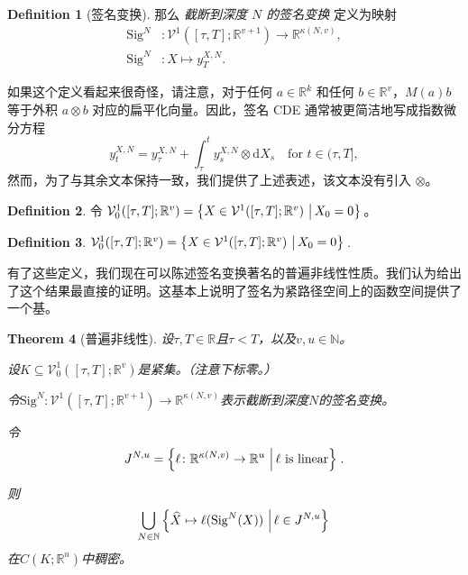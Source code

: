 \documentclass{ctexart}
\theoremstyle{plain}
\newtheorem{thm}{Theorem}[section]
\theoremstyle{definition}
\newtheorem{definition}[thm]{Definition}
\newcommand{\reals}{\mathbb{R}}
\newcommand{\naturals}{\mathbb{N}}
\newcommand{\set}[2]{\left\{{#1}\,\left\vert\,{#2}\vphantom{{#1}}\right\}\right.}
\begin{document}
\begin{definition}[签名变换]
那么 \emph{截断到深度 $N$ 的签名变换} 定义为映射
\begin{align*}
	\mathrm{Sig}^N &\colon \mathcal{V}^1([\tau, T]; \reals^{v + 1}) \to \reals^{\kappa(N, v)},\\
	\mathrm{Sig}^N &\colon X \mapsto y^{X, N}_T.
\end{align*}

如果这个定义看起来很奇怪，请注意，对于任何 $a \in \reals^k$ 和任何 $b \in \reals^v$，$M(a)b$ 等于外积 $a \otimes b$ 对应的扁平化向量。因此，签名 CDE 通常被更简洁地写成指数微分方程
\begin{equation*}
	y^{X, N}_t = y^{X, N}_\tau + \int_\tau^t y^{X, N}_s \otimes \mathrm{d}X_s\quad\text{for $t \in (\tau, T]$},
\end{equation*}
然而，为了与其余文本保持一致，我们提供了上述表述，该文本没有引入 $\otimes$。\newline
\end{definition}
\begin{definition}
令 $\mathcal{V}^1_0([\tau, T]; \reals^v) = \set{X \in \mathcal{V}^1([\tau, T]; \reals^v)}{X_0 = 0}$。
\end{definition}
\begin{definition}
$\mathcal{V}^1_0([\tau, T]; \reals^v) = \set{X \in \mathcal{V}^1([\tau, T]; \reals^v)}{X_0 = 0}$.
\end{definition}

有了这些定义，我们现在可以陈述签名变换著名的普遍非线性性质。我们认为\cite[Theorem 4.2]{perezarribas2018}给出了这个结果最直接的证明。这基本上说明了签名为紧路径空间上的函数空间提供了一个基。
\begin{thm}[普遍非线性]\label{thm:universal-nonlinearity}
设$\tau, T \in \reals$且$\tau < T$，以及$v, u \in \naturals$。

设$K \subseteq \mathcal{V}^1_0([\tau, T]; \reals^v)$是紧集。（注意下标零。）

令$\mathrm{Sig}^N \colon \mathcal{V}^1([\tau, T]; \reals^{v + 1}) \to \reals^{\kappa(N, v)}$表示截断到深度$N$的签名变换。

令
\begin{equation*}
	J^{N, u} = \set{\ell \colon \reals^{\kappa(N, v)} \to \reals^u}{\ell \text{ is linear}}.
\end{equation*}

则
\begin{equation*}
	\bigcup_{N \in \naturals} \set{\widehat{X} \mapsto \ell(\mathrm{Sig}^N(X))}{\ell \in J^{N, u}}
\end{equation*}
在$C(K; \reals^u)$中稠密。
\end{thm}
\end{document}
